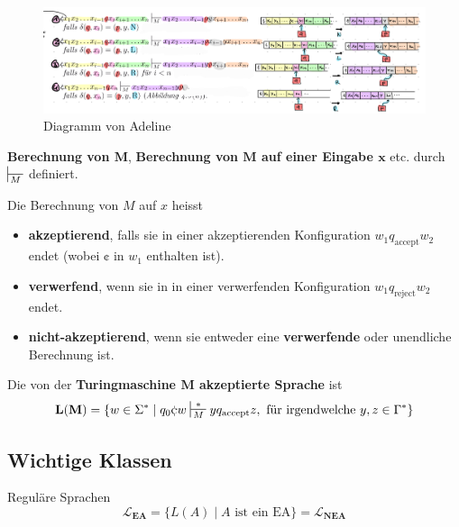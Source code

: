 \documentclass[a4paper, 11pt]{article}
\begin{document}
        \begin{figure}[htp]
            \includegraphics[width=\textwidth]{Schrittrelation.png}
            \caption{Diagramm von Adeline}
        \end{figure}
    
        \textbf{Berechnung von $\mathbf{M}$}, \textbf{Berechnung von $\mathbf{M}$ auf einer Eingabe $\mathbf{x}$} etc. durch $\sststile{M}{}$ definiert.
    
        \begin{mainbox}{}
            Die Berechnung von $M$ auf $x$ heisst 
            \begin{itemize}[label=-]
                \item \textbf{akzeptierend}, falls sie in einer akzeptierenden Konfiguration $w_1q_{\text{accept}}w_2$ endet (wobei $\cent$ in $w_1$ enthalten ist).
                \item \textbf{verwerfend}, wenn sie in in einer verwerfenden Konfiguration $w_1q_{\text{reject}}w_2$ endet.
                \item \textbf{nicht-akzeptierend}, wenn sie entweder eine \textbf{verwerfende} oder unendliche Berechnung ist.
            \end{itemize}
        \end{mainbox}
    
        \begin{mainbox}{}
            Die von der \textbf{Turingmaschine $\mathbf{M}$ akzeptierte Sprache} ist 
            $$\mathbf{L(M)} = \{w \in \Sigma^* \mid q_0\cent w \sststile{M}{*}yq_{\text{accept}}z, \text{ für irgendwelche }y, z \in \Gamma^*\}$$
        \end{mainbox}
    
    
    
        \subsection{Wichtige Klassen}
        \begin{subbox}{Reguläre Sprachen}
            $$\mathbf{\mathcal{L}_{\textbf{EA}}} = \{L(A) \mid A \text{ ist ein EA}\} = {\mathcal{L}_{\textbf{NEA}}}$$
        \end{subbox}
    
\end{document}
